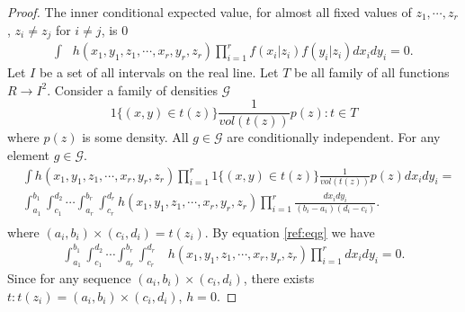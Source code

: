 \documentclass{article}
\begin{document}
\begin{proof}
The inner conditional expected value, for almost all fixed values of $z_1, \cdots,z_r$, $z_i\neq z_j$ for $i\neq j$, is 0
\begin{align}
\label{ref:eqg}
 \int &h(x_1,y_1,z_1, \cdots, x_r,y_r,z_r)  \prod_{i=1}^{r} f(x_i|z_i)f(y_i|z_i) dx_i dy_i = 0.
\end{align}
Let $I$ be a set of all intervals on the real line. Let  $T$ be all family of all functions $R \to I^2$. Consider a family of densities $\mathcal G$
\[
 1\{ (x,y) \in t(z) \}  \frac{1}{vol(t(z))} p(z): t \in T
\]
where $p(z)$ is some density. All $g \in \mathcal G$ are conditionally independent. For any element $g \in \mathcal G$.
\begin{align}
&\int h(x_1,y_1,z_1, \cdots, x_r,y_r,z_r) \prod_{i=1}^{r} 1\{ (x,y) \in t(z) \}  \frac{1}{vol(t(z))} p(z)dx_i dy_i =\\ 
&\int_{a_1}^{b_1} \int_{c_1}^{d_2} \cdots \int_{a_r}^{b_r} \int_{c_r}^{d_r} h(x_1,y_1,z_1, \cdots, x_r,y_r,z_r) \prod_{i=1}^{r}  \frac{dx_i dy_i}{(b_i - a_i)(d_i-c_i) }. \\   
\end{align}
where $(a_i,b_i) \times (c_i,d_i) = t(z_i)$. 
By equation \ref{ref:eqg} we have 
\begin{align}
 \int_{a_1}^{b_1} \int_{c_1}^{d_2} \cdots \int_{a_r}^{b_r} \int_{c_r}^{d_r}& h(x_1,y_1,z_1, \cdots, x_r,y_r,z_r) \prod_{i=1}^{r}  dx_i dy_i = 0.
\end{align}
Since for any  sequence $ (a_i,b_i)\times (c_i,d_i) $, there exists  $t: t(z_i) = (a_i,b_i)\times (c_i,d_i) $, $h=0$. 
\end{proof}

% 
\end{document}
